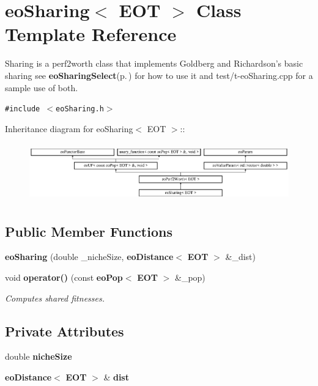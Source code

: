 \section{eo\-Sharing$<$ EOT $>$ Class Template Reference}
\label{classeo_sharing}
Sharing is a perf2worth class that implements Goldberg and Richardson's basic sharing see {\bf eo\-Sharing\-Select}{\rm (p.\,\pageref{classeo_sharing_select})} for how to use it and test/t-eo\-Sharing.cpp for a sample use of both.  


{\tt \#include $<$eo\-Sharing.h$>$}

Inheritance diagram for eo\-Sharing$<$ EOT $>$::\begin{figure}[H]
\begin{center}
\leavevmode
\includegraphics[height=2.52252cm]{classeo_sharing}
\end{center}
\end{figure}
\subsection*{Public Member Functions}
\begin{CompactItemize}
\item 
{\bf eo\-Sharing} (double \_\-niche\-Size, {\bf eo\-Distance}$<$ {\bf EOT} $>$ \&\_\-dist)\label{classeo_sharing_a0}

\item 
void {\bf operator()} (const {\bf eo\-Pop}$<$ {\bf EOT} $>$ \&\_\-pop)\label{classeo_sharing_a1}

\begin{CompactList}\small\item\em Computes shared fitnesses. \item\end{CompactList}\end{CompactItemize}
\subsection*{Private Attributes}
\begin{CompactItemize}
\item 
double {\bf niche\-Size}\label{classeo_sharing_r0}

\item 
{\bf eo\-Distance}$<$ {\bf EOT} $>$ \& {\bf dist}\label{classeo_sharing_r1}

\end{CompactItemize}


